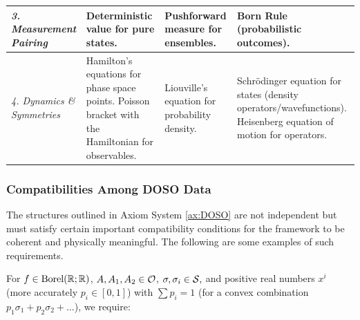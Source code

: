 {\begin{longtable}{|p{}|p{}|p{}|p{}|}
\textit{3. Measurement Pairing} &
Deterministic value for pure states. &
Pushforward measure for ensembles. &
Born Rule (probabilistic outcomes).
\\
\hline

\textit{4. Dynamics \& Symmetries} &
Hamilton's equations for phase space points.
\newline
Poisson bracket with the Hamiltonian for observables. &
Liouville's equation for probability density. &
Schrödinger equation for states (density operators/wavefunctions).
\newline
Heisenberg equation of motion for operators.
\\
\hline

\end{longtable}
}

\subsubsection{Compatibilities Among DOSO Data}
The structures outlined in Axiom System \ref{ax:DOSO} are not independent but must satisfy certain important compatibility conditions for the framework to be coherent and physically meaningful. The following are some examples of such requirements.

For $f\in \text{Borel}(\mathbb{R};\mathbb{R})$, $A, A_{1}, A_{2}\in\mathcal{O}$, $\sigma, \sigma_{i}\in\mathcal{S},$ and positive real numbers $x^{i}$ (more accurately $p_i \in [0,1]$) with $\sum p_i = 1$ (for a convex combination $p_1\sigma_1 + p_2\sigma_2 + \dots$), we require:

